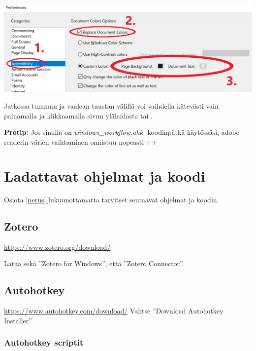 \documentclass[a4paper,12pt]{scrartcl}
\newcommand*{\fullref}[1]{\hyperref[{#1}]{\ref*{#1} \nameref*{#1}}} %
\begin{document}
\includegraphics[width=\textwidth]{img/adobe_reader}

Jatkossa tumman ja vaalean taustan välillä voi vaihdella kätevästi vain painamalla ja klikkaamalla sivun ylälaidasta  tai .

\textbf{Protip:} Jos sinulla on \emph{windows\_workflow.ahk} -koodinpätkä käytössäsi, adobe readerin värien vaihtaminen onnistuu nopeasti ++

\pagebreak \section{Ladattavat ohjelmat ja koodi}
Osiota \fullref{perus} lukuunottamatta tarvitset seuraavat ohjelmat ja koodin.





\subsection{Zotero}
\url{https://www.zotero.org/download/}


Lataa sekä ''Zotero for Windows'', että ''Zotero Connector''. 

\subsection{Autohotkey}
\url{https://www.autohotkey.com/download/}
Valitse ''Download Autohotkey Installer''

\subsubsection{Autohotkey scriptit} \label{downloads}
\end{document}
